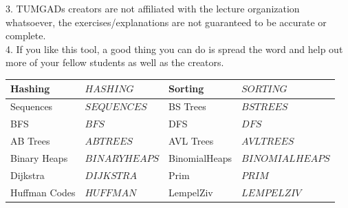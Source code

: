 \documentclass[12pt]{article}
\begin{document}
        3. TUMGADs creators are not affiliated with the lecture organization whatsoever, the exercises/explanations are not
        guaranteed to be accurate or complete.
        \\[0.2in]
        4. If you like this tool, a good thing you can do is spread the word and help out more of your fellow students as well as the creators.
    \vspace{20px}
    \begin{center}
        \begin{tabular}{|P{2.5cm}|P{2.5cm}|P{2.5cm}| P{2.5cm} |}
            \hline
            Hashing & $HASHING$ & Sorting & $SORTING$ \\ \hline
            Sequences & $SEQUENCES$ & BS Trees & $BSTREES$ \\ \hline
            BFS & $BFS$ & DFS & $DFS$ \\ \hline
            AB Trees & $ABTREES$ & AVL Trees & $AVLTREES$ \\ \hline
            Binary Heaps & $BINARYHEAPS$ & BinomialHeaps & $BINOMIALHEAPS$ \\ \hline
            Dijkstra & $DIJKSTRA$ & Prim & $PRIM$ \\ \hline
            Huffman Codes & $HUFFMAN$ & LempelZiv &  $LEMPELZIV$ \\ \hline
        \end{tabular}
    \end{center}
    \newpage
\end{document}
